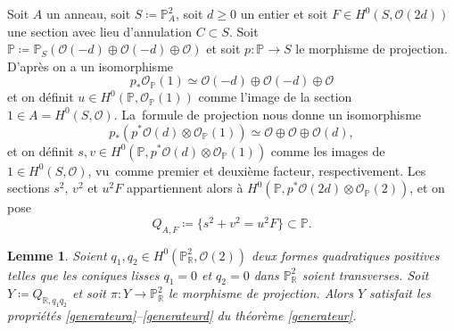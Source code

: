 \documentclass[JEP,XML,SOM,Unicode,francais,published]{cedram}
\newtheorem{lemma}[thm]{Lemme}
\theoremstyle{definition}
\newcommand{\R}{\mathbb R}
\renewcommand{\P}{\mathbb P}
\newcommand{\mc}[1]{\mathcal{#1}}
\begin{document}
Soit $A$ un anneau, soit $S\coloneqq \P^2_A$, soit $d\geq 0$ un entier et soit $F \in H^0(S, \mc{O}(2d))$ une section avec lieu d'annulation $C\subset S$. Soit $\P \coloneqq \P_S(\mc{O}(-d) \oplus \mc{O}(-d) \oplus \mathcal{O})$ et soit $p\colon \P\to S$ le morphisme de projection. D'après \cite[Ch.\,2, Prop.\,7.11(a)]{hartshorne} on a un isomorphisme \[p_* \mathcal{O}_{\P}(1) \simeq \mc{O}(-d) \oplus \mc{O}(-d) \oplus \mathcal{O}\] et on définit $u \in H^0(\P, \mathcal{O}_{\P}(1))$ comme l'image de la section $1\in A=H^0(S,\mc{O})$.
La~formule de projection nous donne un isomorphisme
\[ p_*(p^*\mc{O}(d) \otimes \mathcal{O}_{\P}(1)) \simeq \mathcal{O} \oplus \mathcal{O} \oplus \mc{O}(d),\]
et on définit $s, v \in H^0(\P, p^*\mc{O}(d) \otimes \mathcal{O}_{\P}(1))$ comme les images de $1\in H^0(S,\mc{O})$, vu~com\-me premier et deuxième facteur, respectivement. Les sections $s^2$, $v^2$ et $u^2F$ appartiennent alors à $H^0(\P,p^*\mc{O}(2d)\otimes \mc{O}_\P(2))$, et on pose
\[Q_{A,F}\coloneqq \{s^2+v^2=u^2F\}\subset \P.\]

\begin{lemma}\label{refBW}
Soient $q_1,q_2\in H^0(\P^2_\R, \mc{O}(2))$ deux formes quadratiques positives telles que les coniques lisses $q_1=0$ et $q_2=0$ dans $\P^2_\R$ soient transverses. Soit $Y\coloneqq Q_{\R, q_1q_2}$ et soit $\pi \colon Y \to \P^2_{\R}$ le morphisme de projection. Alors $Y$ satisfait les propriétés \eqref{generateura}--\eqref{generateurd} du théorème \ref{generateur}.
\end{lemma}
\end{document}
